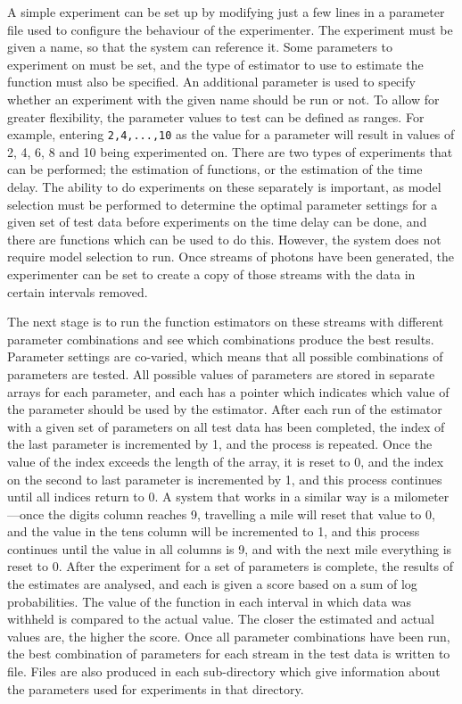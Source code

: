 \documentclass[a4paper,11pt]{article}
\begin{document}
   A simple experiment can be set up by modifying just a few lines in a
   parameter file used to configure the behaviour of the experimenter. The
   experiment must be given a name, so that the system can reference it. Some
   parameters to experiment on must be set, and the type of estimator to use to
   estimate the function must also be specified. An additional parameter is used
   to specify whether an experiment with the given name should be run or not. To
   allow for greater flexibility, the parameter values to test can be defined as
   ranges. For example, entering \texttt{2,4,...,10} as the value for a
   parameter will result in values of 2, 4, 6, 8 and 10 being experimented
   on. There are two types of experiments that can be performed; the estimation
   of functions, or the estimation of the time delay. The ability to do
   experiments on these separately is important, as model selection must be
   performed to determine the optimal parameter settings for a given set of test
   data before experiments on the time delay can be done, and there are
   functions which can be used to do this. However, the system does not require
   model selection to run. Once streams of photons have been generated, the
   experimenter can be set to create a copy of those streams with the data in
   certain intervals removed.
   
   The next stage is to run the function estimators on these streams with
   different parameter combinations and see which combinations produce the best
   results. Parameter settings are co-varied, which means that all possible
   combinations of parameters are tested. All possible values of parameters are
   stored in separate arrays for each parameter, and each has a pointer which
   indicates which value of the parameter should be used by the estimator. After
   each run of the estimator with a given set of parameters on all test data has
   been completed, the index of the last parameter is incremented by 1, and the
   process is repeated. Once the value of the index exceeds the length of the
   array, it is reset to 0, and the index on the second to last parameter is
   incremented by 1, and this process continues until all indices return to 0. A
   system that works in a similar way is a milometer---once the digits column
   reaches 9, travelling a mile will reset that value to 0, and the value in the
   tens column will be incremented to 1, and this process continues until the
   value in all columns is 9, and with the next mile everything is reset
   to 0. After the experiment for a set of parameters is complete, the results
   of the estimates are analysed, and each is given a score based on a sum of
   log probabilities. The value of the function in each interval in which data
   was withheld is compared to the actual value. The closer the estimated and
   actual values are, the higher the score. Once all parameter combinations have
   been run, the best combination of parameters for each stream in the test data
   is written to file. Files are also produced in each sub-directory which give
   information about the parameters used for experiments in that directory. 
\end{document}
